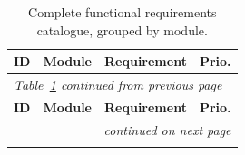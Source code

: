 \renewcommand{\arraystretch}{1.25}
\begin{longtable}{p{} p{} p{} p{}}
\caption{Complete functional requirements catalogue, grouped by module.}
\label{tab:app-fr}\\
\toprule
\textbf{ID} & \textbf{Module} & \textbf{Requirement} & \textbf{Prio.} \\
\midrule
\endfirsthead
\multicolumn{4}{l}{\small\itshape Table~\ref{tab:app-fr} continued from previous page}\\
\toprule
\textbf{ID} & \textbf{Module} & \textbf{Requirement} & \textbf{Prio.} \\
\midrule
\endhead
\midrule
\multicolumn{4}{r}{\small\itshape continued on next page}\\
\endfoot
\bottomrule
\endlastfoot


\end{longtable}
